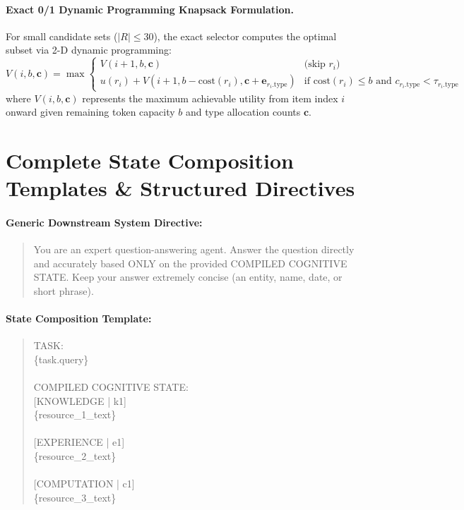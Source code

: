 \documentclass{article}
\begin{document}
\paragraph{Exact 0/1 Dynamic Programming Knapsack Formulation.} For small candidate sets ($|R| \leq 30$), the exact selector computes the optimal subset via 2-D dynamic programming:
\begin{equation}
V(i, b, \mathbf{c}) = \max \begin{cases}
V(i+1, b, \mathbf{c}) & \text{(skip } r_i\text{)} \\
u(r_i) + V(i+1, b - \text{cost}(r_i), \mathbf{c} + \mathbf{e}_{r_i.\text{type}}) & \text{if } \text{cost}(r_i) \leq b \text{ and } c_{r_i.\text{type}} < \tau_{r_i.\text{type}}
\end{cases}
\end{equation}
where $V(i, b, \mathbf{c})$ represents the maximum achievable utility from item index $i$ onward given remaining token capacity $b$ and type allocation counts $\mathbf{c}$.

\section{Complete State Composition Templates \& Structured Directives}

\paragraph{Generic Downstream System Directive:}
\begin{quote}
\small\ttfamily
You are an expert question-answering agent. Answer the question directly and accurately based ONLY on the provided COMPILED COGNITIVE STATE. Keep your answer extremely concise (an entity, name, date, or short phrase).
\end{quote}

\paragraph{State Composition Template:}
\begin{quote}
\small\ttfamily
TASK:\\
\{task.query\}\\
\\
COMPILED COGNITIVE STATE:\\
\mbox{}[KNOWLEDGE | k1]\\
\{resource\_1\_text\}\\
\\
\mbox{}[EXPERIENCE | e1]\\
\{resource\_2\_text\}\\
\\
\mbox{}[COMPUTATION | c1]\\
\{resource\_3\_text\}
\end{quote}
\end{document}

